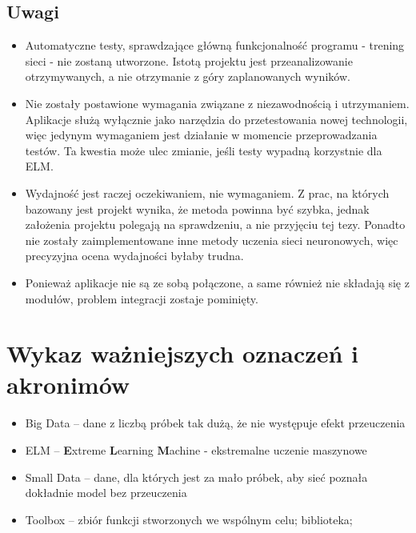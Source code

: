 \documentclass{article}
\begin{document}
\subsection{Uwagi}
\begin{itemize}
\item Automatyczne testy, sprawdzające główną funkcjonalność programu - trening sieci - nie zostaną utworzone. Istotą projektu jest przeanalizowanie otrzymywanych, a nie otrzymanie z góry zaplanowanych wyników.
\item Nie zostały postawione wymagania związane z niezawodnością i utrzymaniem. Aplikacje służą wyłącznie jako narzędzia do przetestowania nowej technologii, więc jedynym wymaganiem jest działanie w momencie przeprowadzania testów. Ta kwestia może ulec zmianie, jeśli testy wypadną korzystnie dla ELM.
\item Wydajność jest raczej oczekiwaniem, nie wymaganiem. Z prac, na których bazowany jest projekt wynika, że metoda powinna być szybka, jednak założenia projektu polegają na sprawdzeniu, a nie przyjęciu tej tezy. Ponadto nie zostały zaimplementowane inne metody uczenia sieci neuronowych, więc precyzyjna ocena wydajności byłaby trudna.
\item Ponieważ aplikacje nie są ze sobą połączone, a same również nie składają się z modułów, problem integracji zostaje pominięty.
\end{itemize}
\clearpage
\section{Wykaz ważniejszych oznaczeń i akronimów}
\begin{itemize}[label={},leftmargin=*]
\item Big Data -- dane z liczbą próbek tak dużą, że nie występuje efekt przeuczenia
\item ELM -- \textbf{E}xtreme \textbf{L}earning \textbf{M}achine - ekstremalne uczenie maszynowe
\item Small Data -- dane, dla których jest za mało próbek, aby sieć poznała dokładnie model bez przeuczenia
\item Toolbox -- zbiór funkcji stworzonych we wspólnym celu; biblioteka;
\end{itemize}
\end{document}

